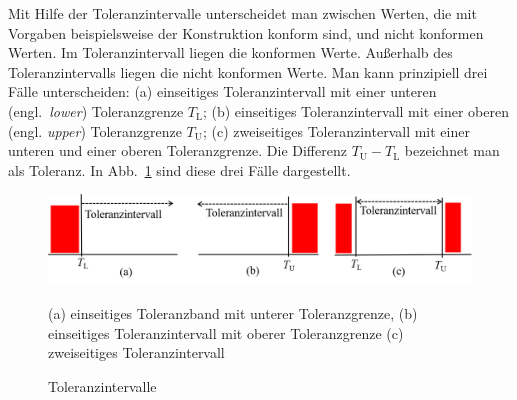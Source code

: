 Mit Hilfe der Toleranzintervalle unterscheidet man zwischen Werten, die mit
Vorgaben beispielsweise der Konstruktion konform sind, und nicht konformen Werten.
Im Toleranzintervall liegen die konformen Werte. Außerhalb des Toleranzintervalls liegen die nicht konformen Werte. Man kann prinzipiell drei Fälle unterscheiden: (a) einseitiges Toleranzintervall mit einer unteren (engl.\ \textsl{lower}) Toleranzgrenze $T_\mathrm{L}$; (b) einseitiges Toleranzintervall mit einer oberen (engl. \textsl{upper}) Toleranzgrenze $T_\mathrm{U}$; (c) zweiseitiges Toleranzintervall mit einer unteren und einer oberen Toleranzgrenze. Die Differenz $T_\mathrm{U} - T_\mathrm{L}$ bezeichnet man als Toleranz.
In Abb.~\ref{fig:Toleranzintervalle} sind diese drei Fälle dargestellt.

\begin{figure}[!htp]
	\begin{center}
		\includegraphics[width=130mm]{05_vorlesung/media/Toleranzintervalle.png}
		\caption{\label{fig:Toleranzintervalle}	Toleranzintervalle} (a) einseitiges Toleranzband mit unterer Toleranzgrenze, (b) einseitiges Toleranzintervall mit oberer Toleranzgrenze (c) zweiseitiges Toleranzintervall
	\end{center}
\end{figure}


